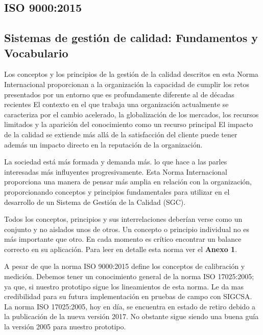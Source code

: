 \subsection{ISO 9000:2015 \cite{iso9000}}
\subsection*{Sistemas de gestión de calidad: Fundamentos y Vocabulario}

\par 
Los conceptos y los principios de la gestión de la calidad descritos en esta Norma Internacional
proporcionan a la organización la capacidad de cumplir los retos presentados por un entorno que es
profundamente diferente al de décadas recientes El contexto en el que trabaja una organización
actualmente se caracteriza por el cambio acelerado, la globalización de los mercados, los recursos
limitados y la aparición del conocimiento como un recurso principal El impacto de la calidad se extiende
más allá de la satisfacción del cliente puede tener además un impacto directo en la reputación de la
organización.

\par \noindent 
La sociedad está más formada y demanda más. lo que hace a las parles interesadas más influyentes
progresivamente. Esta Norma Internacional proporciona una manera de pensar más amplia en relación
con la organización, proporcionando conceptos y principios fundamentales para utilizar en el desarrollo
de un Sistema de Gestión de la Calidad (SGC).

\clearpage

\par \noindent 
Todos los conceptos, principios y sus interrelaciones deberían verse como un conjunto y no aislados unos de otros. Un concepto o principio individual no es más importante que otro. En cada momento es crítico encontrar un balance correcto en su aplicación. Para leer en detalle esta norma ver el \textbf{Anexo 1}.

\par \noindent
A pesar de que la norma ISO 9000:2015 define los conceptos de calibración y medición. Debemos tener un conocimiento general de la norma ISO 17025:2005; ya que, si nuestro prototipo sigue los lineamientos de esta norma. Le da mas credibilidad para su futura implementación en pruebas de campo con SIGCSA. La norma ISO 17025:2005, hoy en día, se encuentra en estado de retiro debido a la publicación de la nueva versión 2017. No obstante sigue siendo una buena guía la versión 2005 para nuestro prototipo.
